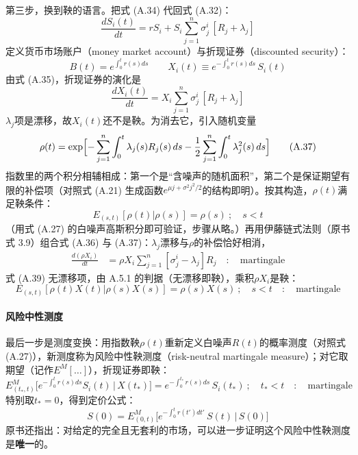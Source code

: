 第三步，换到鞅的语言。把式 (A.34) 代回式 (A.32)：
\begin{equation*}
\frac{dS_i(t)}{dt}=rS_i+S_i\sum_{j=1}^{n}\sigma^i_j\,[R_j+\lambda_j]
\tag{A.35}
\end{equation*}
定义货币市场账户（money market account）与折现证券（discounted security）：
\begin{equation*}
B(t)=e^{\int_0^t r(s)ds}
\qquad
X_i(t)\equiv e^{-\int_0^t r(s)ds}\,S_i(t)
\end{equation*}
由式 (A.35)，折现证券的演化是
\begin{equation*}
\frac{dX_i(t)}{dt}=X_i\sum_{j=1}^{n}\sigma^i_j\,[R_j+\lambda_j]
\tag{A.36}
\end{equation*}
$\lambda_j$项是漂移，故$X_i(t)$还不是鞅。为消去它，引入随机变量
\begin{equation*}
\rho(t)=\exp\Bigl[-\sum_{j=1}^{n}\int_0^t\lambda_j(s)R_j(s)\,ds
-\frac{1}{2}\sum_{j=1}^{n}\int_0^t\lambda_j^2(s)\,ds\Bigr]
\tag{A.37}
\end{equation*}
指数里的两个积分相辅相成：第一个是“含噪声的随机面积”，第二个是保证期望有限的补偿项（对照式 (A.21) 生成函数$e^{\mu j+\sigma^2 j^2/2}$的结构即明）。按其构造，$\rho(t)$满足鞅条件：
\begin{equation*}
E_{(s,t)}[\rho(t)|\rho(s)]=\rho(s)
\ ;\quad s<t
\tag{A.38}
\end{equation*}
（用式 (A.27) 的白噪声高斯积分即可验证，步骤从略。）再用伊藤链式法则（原书式 3.9）组合式 (A.36) 与 (A.37)：$\lambda_j$漂移与$\rho$的补偿恰好相消，
\begin{align*}
\frac{d(\rho X_i)}{dt}
&=\rho X_i\sum_{j=1}^{n}[\sigma^i_j-\lambda_j]R_j
\quad:\quad\text{martingale}
\tag{A.39}
\end{align*}
式 (A.39) 无漂移项，由 A.5.1 的判据（无漂移即鞅），乘积$\rho X_i$是鞅：
\begin{equation*}
E_{(s,t)}[\rho(t)X(t)|\rho(s)X(s)]=\rho(s)X(s)
\ ;\quad s<t
\quad:\quad\text{martingale}
\end{equation*}

\paragraph{风险中性测度}
最后一步是测度变换：用指数鞅$\rho(t)$重新定义白噪声$R(t)$的概率测度（对照式 (A.27)），新测度称为风险中性鞅测度（risk-neutral martingale measure）；对它取期望（记作$E^{M}[\ldots]$），折现证券即鞅：
\begin{equation*}
E^{M}_{(t_*,t)}
\bigl[e^{-\int_0^t r(s)ds}S_i(t)\,|\,X(t_*)\bigr]
=e^{-\int_0^{t_*}r(s)ds}\,S_i(t_*)
\ ;\quad t_*<t
\quad:\quad\text{martingale}
\end{equation*}
特别取$t_*=0$，得到定价公式：
\begin{equation*}
S(0)=E^{M}_{(0,t)}
\bigl[e^{-\int_0^t r(t')dt'}\,S(t)\,|\,S(0)\bigr]
\tag{A.40}
\end{equation*}
原书还指出：对给定的完全且无套利的市场，可以进一步证明这个风险中性鞅测度是\textbf{唯一}的。

